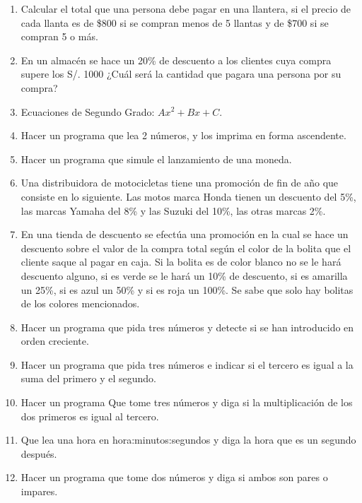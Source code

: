 \documentclass{scrartcl}
\begin{document}
\begin{enumerate}
		\item Calcular el total que una persona debe pagar en una llantera, si el precio de cada llanta es de \$800 si se compran menos de 5 llantas y de \$700 si se compran	5 o más.
		
		\item En un almacén se hace un 20\% de descuento a los clientes cuya compra
		supere los S/. 1000 ¿Cuál será la cantidad que pagara una persona por su
		compra?
		
		\item Ecuaciones de Segundo Grado: $Ax^2 + Bx + C$.
		
		\item Hacer un programa que lea 2 números, y los imprima en forma ascendente.
		
		\item Hacer un programa que simule el lanzamiento de una moneda.
		
		\item Una distribuidora de motocicletas tiene una promoción de fin de año que consiste en lo siguiente. Las motos marca Honda tienen un descuento del 5\%, las	marcas Yamaha del 8\% y las Suzuki del 10\%, las otras marcas 2\%.
		
		\item En una tienda de descuento se efectúa una promoción en la cual se hace un descuento sobre el valor de la compra total según el color de la bolita que el 	cliente saque al pagar en caja. Si la bolita es de color blanco no se le hará 	descuento alguno, si es verde se le hará un 10\% de descuento, si es amarilla un 25\%, si es azul un 50\% y si es roja un 100\%. Se sabe que solo hay bolitas de los colores mencionados.
		
		\item Hacer un programa que pida tres números y detecte si se han introducido en
		orden creciente.
		
		\item Hacer un programa que pida tres números e indicar si el tercero es igual a la suma del primero y el segundo.
		
		\item Hacer un programa Que tome tres números y diga si la multiplicación de los
		dos primeros es igual al tercero.
		
		\item Que lea una hora en hora:minutos:segundos y diga la hora que es un segundo
		después.
		
		\item Hacer un programa que tome dos números y diga si ambos son pares o
		impares.
				

\end{enumerate}
\end{document}
